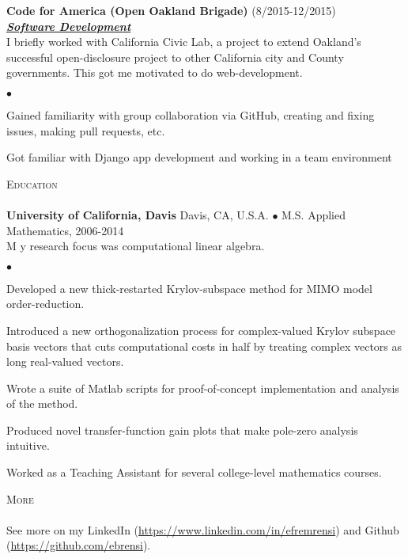 \documentclass{article}
\newcommand{\lineunder}{\vspace*{-8pt} \\ \hspace*{-18pt} \hrulefill \\}
\newcommand{\header}[1]{{\hspace*{-15pt}\vspace*{6pt} \textsc{#1}} \vspace*{-6pt} \lineunder}
\newcommand{\employer}[3]{{ \textbf{#1} (#2)\\ \underline{\textbf{\emph{#3}}}\\  }}
\newenvironment{achievements}{\begin{list}{$\bullet$}{\topsep 0pt \itemsep -2pt}}{\vspace*{4pt}\end{list}}
\newcommand{\school}[4]{
 \textbf{#1} #2 $\bullet$ #3\\
#4
}
\begin{document}
\employer{Code for America (Open Oakland Brigade)}{8/2015-12/2015}{Software Development}
I briefly worked with California Civic Lab, a project to extend Oakland's successful open-disclosure project to other California city and County governments.  This got me motivated to do web-development.
\begin{achievements}
\item Gained familiarity with group collaboration via GitHub, creating and fixing issues, making pull requests, etc.
\item Got familiar with Django app development and working in a team environment
\end{achievements}

\header{Education}
\school{University of California, Davis}{Davis, CA, U.S.A.}{M.S. Applied Mathematics, 2006-2014}

My research focus was computational linear algebra.
\begin{achievements}
\item Developed a new thick-restarted Krylov-subspace method for MIMO model order-reduction.
\item Introduced a new orthogonalization process for complex-valued Krylov subspace basis vectors that cuts computational costs in half by treating complex vectors as long real-valued vectors.
\item Wrote a suite of Matlab scripts for proof-of-concept implementation and analysis of the method.
\item  Produced novel transfer-function gain plots that make pole-zero analysis intuitive.
\item Worked as a Teaching Assistant for several college-level mathematics courses.
\end{achievements}
\medskip

\header{More}
See more on my LinkedIn (\url{https://www.linkedin.com/in/efremrensi}) and Github (\url{https://github.com/ebrensi}). 
\end{document}
